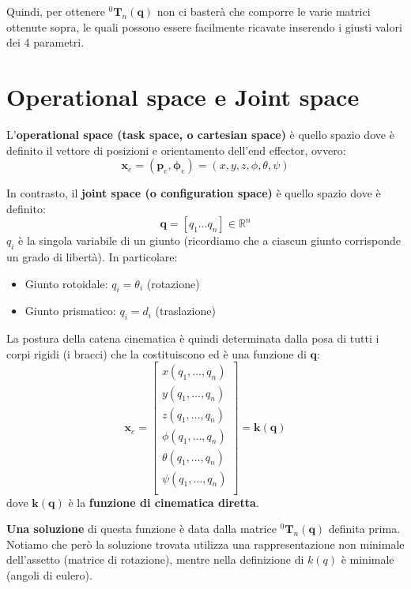 Quindi, per ottenere ${}^0\mathbf{T}_{n}(\mathbf{q})$ non ci basterà che comporre le varie matrici ottenute sopra, le quali possono essere facilmente ricavate inserendo i giusti valori dei 4 parametri.





\section{Operational space e Joint space}

L'\textbf{operational space (task space, o cartesian space)} è quello spazio dove è definito il vettore di posizioni e orientamento dell'end effector, ovvero:
$$
\boldsymbol{x}_e = (\boldsymbol{p}_e, \boldsymbol{\phi}_e) = (x, y, z, \phi, \theta, \psi)
$$

In contrasto, il \textbf{joint space (o configuration space)} è quello spazio dove è definito:
$$
\mathbf{q} = [q_1 \dots q_n] \in \mathbb{R}^n
$$
$q_i$ è la singola variabile di un giunto (ricordiamo che a ciascun giunto corrisponde un grado di libertà). In particolare:
\begin{itemize}
	\item Giunto rotoidale: $q_i = \theta_i$ (rotazione)
	\item Giunto prismatico: $q_i = d_i$ (traslazione)
\end{itemize}

La postura della catena cinematica è quindi determinata dalla posa di tutti i corpi rigidi (i bracci) che la costituiscono ed è una funzione di $\mathbf{q}$:
$$
\boldsymbol{x}_e 
= 
\begin{bmatrix}
	x(q_1, \dots, q_n) \\
	y(q_1, \dots, q_n) \\
	z(q_1, \dots, q_n) \\
	\phi(q_1, \dots, q_n) \\
	\theta(q_1, \dots, q_n) \\
	\psi(q_1, \dots, q_n) \\
\end{bmatrix}
= 
\boldsymbol{k}(\boldsymbol{q})
$$
dove $\boldsymbol{k}(\boldsymbol{q})$ è la \textbf{funzione di cinematica diretta}.

\textbf{Una soluzione} di questa funzione è data dalla matrice ${}^0\mathbf{T}_{n}(\mathbf{q})$ definita prima. Notiamo che però la soluzione trovata utilizza una rappresentazione non minimale dell'assetto (matrice di rotazione), mentre nella definizione di $k(q)$ è minimale (angoli di eulero).

